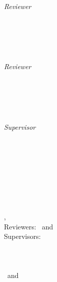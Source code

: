 \begin{titlepage}
    \vfill
    \begin{minipage}[t]{.27\textwidth}
        \raggedleft
        \textit{Reviewer}
    \end{minipage}
    \hspace*{15pt}
    \begin{minipage}[t]{.65\textwidth}
        {\Large \thesisFirstReviewer} \\
        {\small \thesisFirstReviewerDepartment} \\[-1mm]
        {\small \thesisFirstReviewerUniversity}
    \end{minipage} \\[5mm]
    \begin{minipage}[t]{.27\textwidth}
        \raggedleft
        \textit{Reviewer}
    \end{minipage}
    \hspace*{15pt}
    \begin{minipage}[t]{.65\textwidth}
        {\Large \thesisSecondReviewer} \\
        {\small \thesisSecondReviewerDepartment} \\[-1mm]
        {\small \thesisSecondReviewerUniversity}
    \end{minipage} \\[10mm]
    \begin{minipage}[t]{.27\textwidth}
        \raggedleft
        \textit{Supervisor}
    \end{minipage}
    \hspace*{15pt}
    \begin{minipage}[t]{.65\textwidth}
        {\Large \thesisFirstSupervisor}\\
        {\small \thesisUniversity} \\[-1mm]
        {\small \thesisUniversityDepartment}
    \end{minipage} \\[15mm]

    \thesisDate \\

\end{titlepage}


\hfill
\vfill
{\small
\textbf{\thesisName} \\
\textit{\thesisTitle} \\
\thesisSubject, \thesisDate \\
Reviewers: \thesisFirstReviewer\ and \thesisSecondReviewer \\
Supervisors: \thesisFirstSupervisor\\[1.5em]
\textbf{\thesisUniversity} \\
\thesisUniversityDepartment \\
\thesisUniversityStreetAddress \\
\thesisUniversityPostalCode\ and \thesisUniversityCity
}
